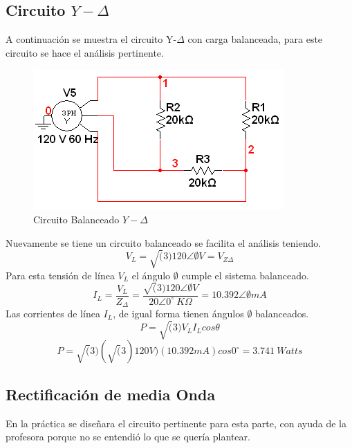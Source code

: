 \documentclass[twocolumn]{IEEEtran}
\begin{document}
\subsection{Circuito $Y-\Delta$}
\noindent
A continuación se muestra el circuito Y-$\Delta$ con carga balanceada, para este circuito se hace el análisis pertinente.
\begin{figure}[H]
	\centering
		\includegraphics[scale=0.7]{circYD.PNG}
	\caption{Circuito Balanceado $Y-\Delta$}
	\label{fig14}
\end{figure}
\noindent
Nuevamente se tiene un circuito balanceado se facilita el análisis teniendo.
\begin{equation}
 V_L = \sqrt(3)120 \angle \emptyset V =V_{Z\Delta}
 \label{ecu58}
\end{equation}
\noindent
Para esta tensión de línea $V_L$ el ángulo $\emptyset$ cumple el sistema balanceado.
\begin{equation}
 I_L =\frac{V_L}{Z_{\Delta}}=\frac{\sqrt(3)120 \angle \emptyset V}{20 \angle 0^\circ\ K \Omega}=10.392\angle \emptyset mA
 \label{ecu59}
\end{equation}
\noindent
Las corrientes de línea $I_L$, de igual forma tienen ángulos $\emptyset$ balanceados.
\begin{equation}
 P = \sqrt(3)  V_L  I_L  cos \theta
\label{ecu60}
\end{equation}
\begin{equation}
 P =\sqrt(3)(\sqrt(3)120 V)(10.392 mA)cos 0^\circ = 3.741\ Watts
\label{ecu61}
\end{equation}

\subsection{Rectificación de media Onda}
\noindent
En la práctica se diseñara el circuito pertinente para esta parte, con ayuda de la profesora porque no se entendió lo que se quería plantear.
\end{document}

